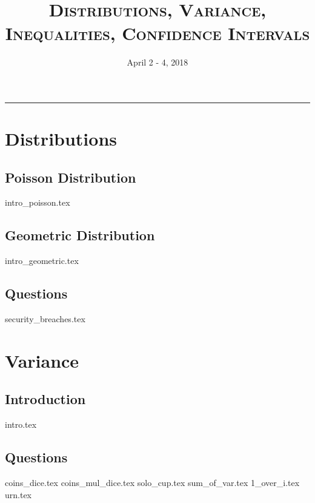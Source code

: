 \documentclass{exam}
\title{\textsc{Distributions, Variance, Inequalities, Confidence Intervals}}
\date{April 2 - 4, 2018}
\begin{document}
\maketitle
\rule{\textwidth}{0.15em}
\fontsize{12}{15}\selectfont
\thispagestyle{empty}

\section{Distributions}
\subsection{Poisson Distribution}
{intro_poisson.tex}
\subsection{Geometric Distribution}
{intro_geometric.tex}
\subsection{Questions}
\begin{questions}
{security_breaches.tex}
\end{questions}

\section{Variance}
\subsection{Introduction}
{intro.tex}
\subsection{Questions}
\begin{questions}
{coins_dice.tex}
{coins_mul_dice.tex}
{solo_cup.tex}
\clearpage
{sum_of_var.tex}
{1_over_i.tex}
{urn.tex}
\end{questions}
\end{document}
